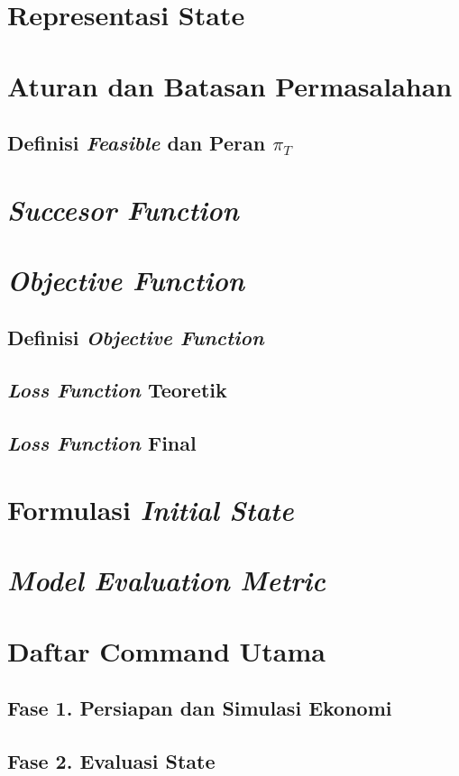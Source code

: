 \section{Representasi State}
\section{Aturan dan Batasan Permasalahan}
\subsection[Definisi Feasible dan Peran Inflasi Terminal]{Definisi \textit{Feasible} dan Peran $\pi_T$}
\section{\textit{Succesor Function}}
\section{\textit{Objective Function}}
\subsection{Definisi \textit{Objective Function}}
\subsection{\textit{Loss Function} Teoretik}
\subsection{\textit{Loss Function} Final}
\section{Formulasi \textit{Initial State}}
\section{\textit{Model Evaluation Metric}}
\section{Daftar Command Utama}
\subsection*{Fase 1. Persiapan dan Simulasi Ekonomi}
\subsection*{Fase 2. Evaluasi State}
